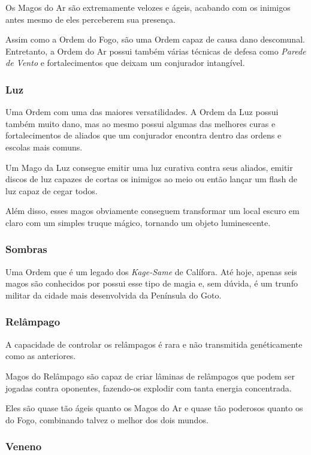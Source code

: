 \documentclass{RPG_Adventure}[2021/10/20]
\begin{document}
Os Magos do Ar são extremamente velozes e ágeis, acabando com os inimigos antes
mesmo de eles perceberem sua presença.

Assim como a Ordem do Fogo, são uma Ordem capaz de causa dano descomunal.
Entretanto, a Ordem do Ar possui também várias técnicas de defesa como
\textit{Parede de Vento} e fortalecimentos que deixam um conjurador intangível.

\subsubsection*{Luz}%

Uma Ordem com uma das maiores versatilidades. A Ordem da Luz possui também muito
dano, mas ao mesmo possui algumas das melhores curas e fortalecimentos de
aliados que um conjurador encontra dentro das ordens e escolas mais comuns.

Um Mago da Luz consegue emitir uma luz curativa contra seus aliados, emitir
discos de luz capazes de cortas os inimigos ao meio ou então lançar um flash de
luz capaz de cegar todos.

Além disso, esses magos obviamente conseguem transformar um local escuro em
claro com um simples truque mágico, tornando um objeto luminescente.

\subsubsection*{Sombras}%

Uma Ordem que é um legado dos \textit{Kage-Same} de Calífora. Até hoje, apenas
seis magos são conhecidos por possui esse tipo de magia e, sem dúvida, é um
trunfo militar da cidade mais desenvolvida da Península do Goto.

\subsubsection*{Relâmpago}%

A capacidade de controlar os relâmpagos é rara e não transmitida genéticamente
como as anteriores.

Magos do Relâmpago são capaz de criar lâminas de relâmpagos que podem ser
jogadas contra oponentes, fazendo-os explodir com tanta energia concentrada.

Eles são quase tão ágeis quanto os Magos do Ar e quase tão poderosos quanto os
do Fogo, combinando talvez o melhor dos dois mundos.

\subsubsection*{Veneno}%
\end{document}
